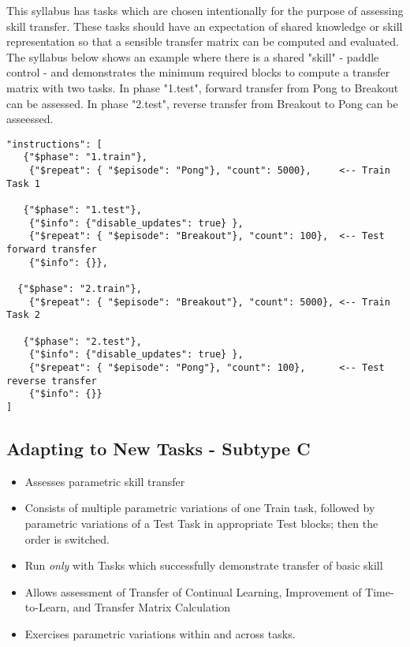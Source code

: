 This syllabus has tasks which are chosen intentionally for the purpose of assessing skill transfer. These tasks should have an expectation of shared knowledge or skill representation so that a sensible transfer matrix can be computed and evaluated. The syllabus below shows an example where there is a shared "skill" - paddle control - and demonstrates the minimum required blocks to compute a transfer matrix with two tasks. In phase "1.test", forward transfer from Pong to Breakout can be assessed. In phase "2.test", reverse transfer from Breakout to Pong can be asseessed.


\begin{small}
\begin{verbatim}
"instructions": [    
   {"$phase": "1.train"}, 
    {"$repeat": { "$episode": "Pong"}, "count": 5000},     <-- Train Task 1

   {"$phase": "1.test"},   
    {"$info": {"disable_updates": true} },  
    {"$repeat": { "$episode": "Breakout"}, "count": 100},  <-- Test forward transfer
    {"$info": {}},
   
  {"$phase": "2.train"},  
    {"$repeat": { "$episode": "Breakout"}, "count": 5000}, <-- Train Task 2

   {"$phase": "2.test"},   
    {"$info": {"disable_updates": true} },
    {"$repeat": { "$episode": "Pong"}, "count": 100},      <-- Test reverse transfer
    {"$info": {}}
]

\end{verbatim}
\end{small}

\subsection*{Adapting to New Tasks - Subtype C}

\begin{itemize}
\item Assesses parametric skill transfer
\item Consists of multiple parametric variations of one Train task, followed by parametric variations of a Test Task in appropriate Test blocks; then the order is switched.
\item Run \textit{only} with Tasks which successfully demonstrate transfer of basic skill
\item Allows assessment of Transfer of Continual Learning, Improvement of Time-to-Learn, and Transfer Matrix Calculation
\item Exercises parametric variations within and across tasks.
\end{itemize}

